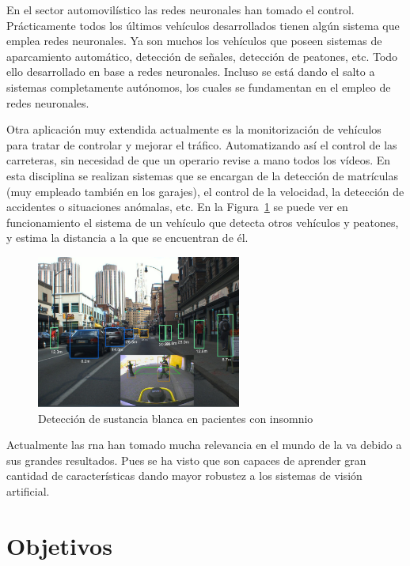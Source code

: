 En el sector automovilístico las redes neuronales han tomado el control. Prácticamente todos los últimos vehículos desarrollados tienen algún sistema que emplea redes neuronales. Ya son muchos los vehículos que poseen sistemas de aparcamiento automático, detección de señales, detección de peatones, etc. Todo ello desarrollado en base a redes neuronales. Incluso se está dando el salto a sistemas completamente autónomos, los cuales se fundamentan en el empleo de redes neuronales.

Otra aplicación muy extendida actualmente es la monitorización de vehículos para tratar de controlar y mejorar el tráfico. Automatizando así el control de las carreteras, sin necesidad de que un operario revise a mano todos los vídeos. En esta disciplina se realizan sistemas que se encargan de la detección de matrículas (muy empleado también en los garajes), el control de la velocidad, la detección de accidentes o situaciones anómalas, etc. En la Figura~\ref{fig.deteccion_redes} se puede ver en funcionamiento el sistema de un vehículo que detecta otros vehículos y peatones, y estima la distancia a la que se encuentran de él.

\begin{figure}[H]
  \begin{center}
    \includegraphics[width=0.6\textwidth]{figures/Introduccion/deteccion_redes.png}
		\caption{Detección de sustancia blanca en pacientes con insomnio}
		\label{fig.deteccion_redes}
		\end{center}
\end{figure}

Actualmente las \acrshort{rna} han tomado mucha relevancia en el mundo de la \acrfull{va} debido a sus grandes resultados. Pues se ha visto que son capaces de aprender gran cantidad de características dando mayor robustez a los sistemas de visión artificial.


\section{Objetivos}

